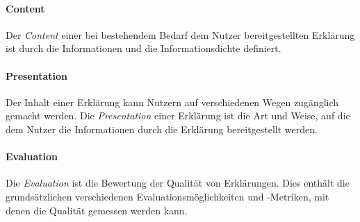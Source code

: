 \paragraph{Content} Der \textit{Content} einer bei bestehendem Bedarf dem Nutzer bereitgestellten Erklärung ist durch die Informationen und die Informationsdichte definiert.

\paragraph{Presentation} Der Inhalt einer Erklärung kann Nutzern auf verschiedenen Wegen zugänglich gemacht werden. Die \textit{Presentation} einer Erklärung ist die Art und Weise, auf die dem Nutzer die Informationen durch die Erklärung bereitgestellt werden.

\paragraph{Evaluation} Die \textit{Evaluation} ist die Bewertung der Qualität von Erklärungen. Dies enthält die grundsätzlichen verschiedenen Evaluationsmöglichkeiten und -Metriken, mit denen die Qualität gemessen werden kann.







